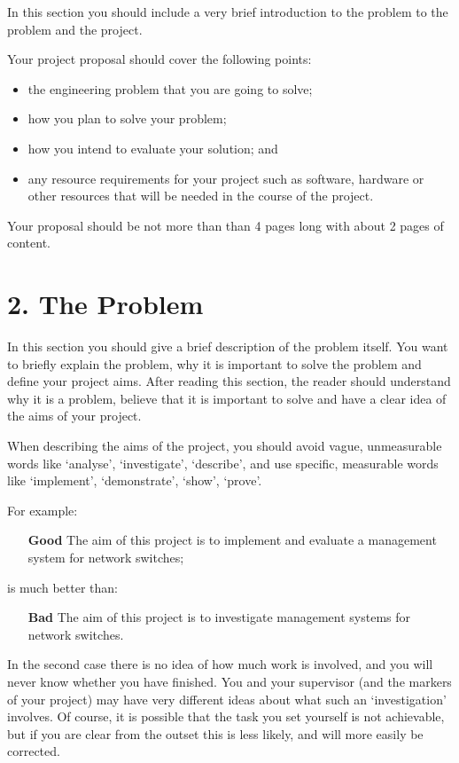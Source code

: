 \documentclass[11pt, a4paper, twoside, openright]{report}
\begin{document}
In this section you should include a very brief introduction to the
problem to the problem and the project.

Your project proposal should cover the following points:

\begin{itemize}
\item the engineering problem that you are going to solve;
\item how you plan to solve your problem;
\item how you intend to evaluate your solution; and
\item any resource requirements for your project such as software,
  hardware or other resources that will be needed in the course of the
  project.
\end{itemize}

Your proposal should be not more than than 4 pages long with about 2 pages of content.

\section*{2. The Problem}

In this section you should give a brief description of the problem
itself. You want to briefly explain the problem, why it is important
to solve the problem and define your project aims. After reading this
section, the reader should understand why it is a problem, believe
that it is important to solve and have a clear idea of the aims of
your project.

When describing the aims of the project, you should avoid vague,
unmeasurable words like `analyse', `investigate', `describe', and use
specific, measurable words like `implement', `demonstrate', `show',
`prove'.

For example:

\begin{itemize}
\item[\bf Good] The aim of this project is to implement and evaluate a
  management system for network switches;
\end{itemize}
is much better than:
\begin{itemize}
\item[\bf Bad] The aim of this project is to investigate management
  systems for network switches.
\end{itemize}

In the second case there is no idea of how much work is involved, and
you will never know whether you have finished. You and your supervisor
(and the markers of your project) may have very different ideas about
what such an `investigation' involves. Of course, it is possible that
the task you set yourself is not achievable, but if you are clear from
the outset this is less likely, and will more easily be corrected.
\end{document}
